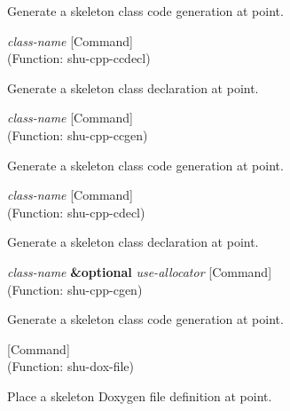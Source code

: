 \begin{doc-string}
Generate a skeleton class code generation at point.
\end{doc-string}

\vspace{1em}
\noindent
{}
\usebox{\funcname}\emph{class-name}
 \hfill [Command]\\%
 (Function: shu-cpp-ccdecl)

\begin{doc-string}
Generate a skeleton class declaration at point.
\end{doc-string}

\vspace{1em}
\noindent
{}
\usebox{\funcname}\emph{class-name}
 \hfill [Command]\\%
 (Function: shu-cpp-ccgen)

\begin{doc-string}
Generate a skeleton class code generation at point.
\end{doc-string}

\vspace{1em}
\noindent
{}
\usebox{\funcname}\emph{class-name}
 \hfill [Command]\\%
 (Function: shu-cpp-cdecl)

\begin{doc-string}
Generate a skeleton class declaration at point.
\end{doc-string}

\vspace{1em}
\noindent
{}
\usebox{\funcname}\emph{class-name} \textbf{\&optional} \emph{use-allocator}
 \hfill [Command]\\%
 (Function: shu-cpp-cgen)

\begin{doc-string}
Generate a skeleton class code generation at point.
\end{doc-string}

\vspace{1em}
\noindent
{}
\usebox{\funcname}
 \hfill [Command]\\%
 (Function: shu-dox-file)

\begin{doc-string}
Place a skeleton Doxygen file definition at point.
\end{doc-string}

